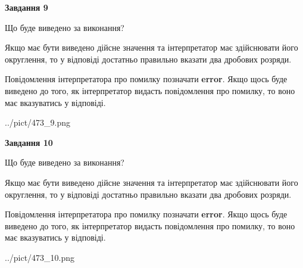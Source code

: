 \documentclass[12pt, ukrainian]{article}
\begin{document}
{\begin {Large}
{\begin {center}\textbf{Завдання 9}\end {center}}\par
Що буде виведено за виконання? \par

Якщо має бути виведено дійсне значення та інтерпретатор має здійснювати його округлення, 
то у відповіді достатньо правильно вказати два дробових розряди.

Повідомлення інтерпретатора про помилку позначати \textbf{error}.
Якщо щось буде виведено до того, як інтерпретатор видасть повідомлення про помилку, 
то воно має вказуватись у відповіді. \par

\begin{center}
	{../pict/473_9.png}
\end{center}
\newpage

{\begin {center}\textbf{Завдання 10}\end {center}}\par
Що буде виведено за виконання? \par

Якщо має бути виведено дійсне значення та інтерпретатор має здійснювати його округлення, 
то у відповіді достатньо правильно вказати два дробових розряди.

Повідомлення інтерпретатора про помилку позначати \textbf{error}.
Якщо щось буде виведено до того, як інтерпретатор видасть повідомлення про помилку, 
то воно має вказуватись у відповіді. \par

\begin{center}
	{../pict/473_10.png}
\end{center}
\newpage

\end {Large}}
\end{document}
